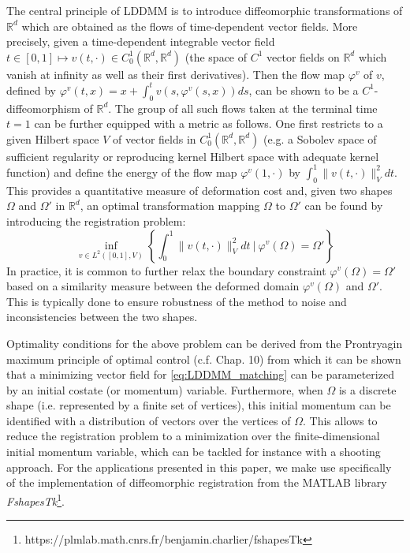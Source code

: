 \documentclass[review]{elsarticle}
\begin{document}
The central principle of LDDMM is to introduce diffeomorphic transformations of $\mathbb{R}^d$ which are obtained as the flows of time-dependent vector fields. More precisely, given a time-dependent integrable vector field $t \in [0,1] \mapsto v(t, \cdot)\in C^1_0(\mathbb{R}^d,\mathbb{R}^d)$ (the space of $C^1$ vector fields on $\mathbb{R}^d$ which vanish at infinity as well as their first derivatives). Then the flow map $\varphi^v$ of $v$, defined  by $\varphi^v(t,x) = x + \int_0^t v(s,\varphi^v(s,x)) ds$, can be shown to be a $C^1$-diffeomorphism of $\mathbb{R}^d$. The group of all such flows taken at the terminal time $t=1$ can be further equipped with a metric as follows. One first restricts to a given Hilbert space $V$ of vector fields in $C^1_0(\mathbb{R}^d,\mathbb{R}^d)$ (e.g. a Sobolev space of sufficient regularity or reproducing kernel Hilbert space with adequate kernel function) and define the energy of the flow map $\varphi^v(1,\cdot)$ by $\int_0^1 \|v(t,\cdot)\|_V^2 dt$. This provides a quantitative measure of deformation cost and, given two shapes $\Omega$ and $\Omega'$ in $\mathbb{R}^d$, an optimal transformation mapping $\Omega$ to $\Omega'$ can be found by introducing the registration problem:
\begin{equation}
\label{eq:LDDMM_matching}
\inf_{v \in L^2([0,1],V)} \left\{ \int_0^1 \|v(t,\cdot)\|_V^2 dt \ | \ \varphi^v(\Omega) = \Omega' \right\}
\end{equation}
In practice, it is common to further relax the boundary constraint $\varphi^v(\Omega) = \Omega'$ based on a similarity measure between the deformed domain $\varphi^v(\Omega)$ and $\Omega'$. This is typically done to ensure robustness of the method to noise and inconsistencies between the two shapes. 

Optimality conditions for the above problem can be derived from the Prontryagin maximum principle of optimal control (c.f. \cite{younes2019shapes} Chap. 10) from which it can be shown that a minimizing vector field for \eqref{eq:LDDMM_matching} can be parameterized by an initial costate (or momentum) variable. Furthermore, when $\Omega$ is a discrete shape (i.e. represented by a finite set of vertices), this initial momentum can be identified with a distribution of vectors over the vertices of $\Omega$. This allows to reduce the registration problem to a minimization over the finite-dimensional initial momentum variable, which can be tackled for instance with a shooting approach. For the applications presented in this paper, we make use specifically of the implementation of diffeomorphic registration from the MATLAB library \textit{FshapesTk}\footnote{https://plmlab.math.cnrs.fr/benjamin.charlier/fshapesTk}. 
\end{document}
